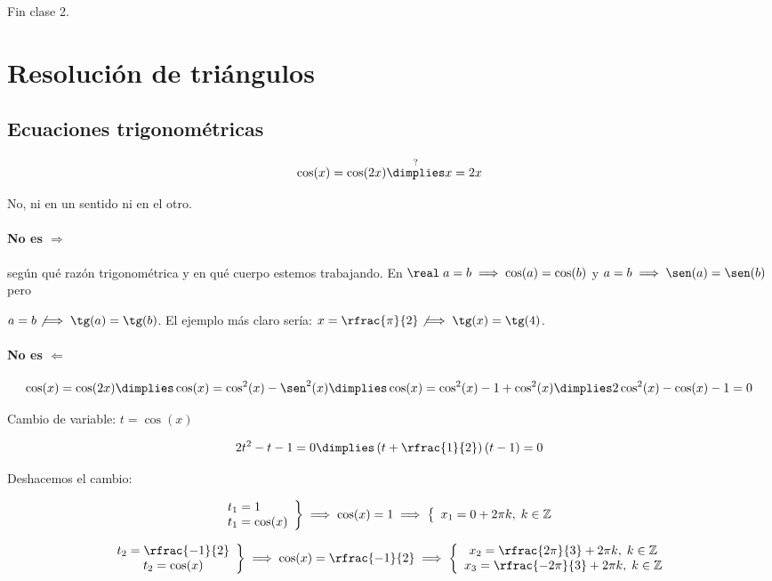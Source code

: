 Fin clase 2.

\section{Resolución de triángulos}

\subsection{Ecuaciones trigonométricas}

\[\cos(x) = \cos(2x) \overset{?}{\dimplies} x=2x\]

No, ni en un sentido ni en el otro. 

\paragraph{No es $\Rightarrow$} según qué razón trigonométrica y en qué cuerpo estemos trabajando. En $\real\; a = b \implies \cos(a)=\cos(b)$ y $a = b \implies \sen(a)=\sen(b)$ pero 

$a = b \not\implies \tg(a)=\tg(b)$. El ejemplo más claro sería: $x = \rfrac{\pi}{2} \not\implies \tg(x) = \tg(4)$.

\paragraph{No es $\Leftarrow$}


\[
\cos(x) = \cos(2x) \dimplies \cos(x) = \cos^2(x) - \sen^2(x) \dimplies \cos(x) = \cos^2(x) - 1 + \cos^2(x) \dimplies 2\cos^2(x) - \cos(x) -1 = 0
\]

Cambio de variable: $t = \cos(x)$

\[
	2t^2-t-1 = 0 \dimplies \left(t+\rfrac{1}{2}\right)(t-1)=0
\]

Deshacemos el cambio:


\[
\left.
\begin{array}{l}
t_1 = 1\\
t_1 = \cos(x)
\end{array}
\right\} \implies \cos(x) = 1\implies \left\{\begin{array}{l}
x_1 = 0 + 2\pi k,\;k\in\mathbb{Z}
\end{array}\right.
\]

\[
\left.
\begin{array}{c}
t_2 = \rfrac{-1}{2}\\
t_2 = \cos(x)
\end{array}
\right\} \implies \cos(x) = \rfrac{-1}{2} \implies \left\{\begin{array}{c}
x_2 = \rfrac{2\pi}{3} + 2\pi k\kinz\\
x_3 = \rfrac{-2\pi}{3} + 2\pi k\kinz
\end{array}\right.
\]


